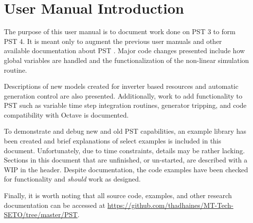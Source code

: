 \vspace{2em} %
\chapter*{User Manual Introduction}

The purpose of this user manual is to document work done on PST 3 to form PST 4. 
It is meant only to augment the previous user manuals and other available documentation about \mbox{PST} \cite{chow1992, PST2LFTut, PST3manual, chow2015}.
%
Major code changes presented include 
how global variables are handled
and the
functionalization of the non-linear simulation routine.

\vspace{1em}
Descriptions of new models created for
inverter based resources
and
automatic generation control
are also presented.
Additionally, work to add functionality to PST such as
variable time step integration routines,
generator tripping, %
and
code compatibility with Octave
is documented.



\vspace{1em}
To demonstrate and debug new and old PST capabilities, 
an example library has been created and brief explanations of select examples is included in this document.
Unfortunately, due to time constraints, details may be rather lacking.
Sections in this document that are unfinished, or un-started, are described with a WIP in the header.
Despite documentation,  the code examples have been checked for functionality and \emph{should} work as designed.


\vspace{1em}
Finally, it is worth noting that all source code, examples, and other research documentation can be accessed at 
\href{https://github.com/thadhaines/MT-Tech-SETO/tree/master/PST}{https://github.com/thadhaines/MT-Tech-SETO/tree/master/PST}.


